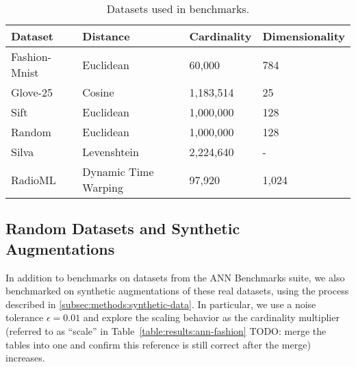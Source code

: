 \begin{table}[!t]
    \caption{Datasets used in benchmarks.}
    \label{table:datasets:summary}
    \vskip 0.15in
    \begin{center}
        \begin{small}
            \begin{sc}
                \begin{tabular}{|l|l|l|l|}
                    \hline
                    \textbf{Dataset} & \textbf{Distance}  &\textbf{Cardinality}  & \textbf{Dimensionality}  \\
                    \hline
                    Fashion-Mnist    & Euclidean              & 60,000             & 784       \\
                    \hline
                    Glove-25         & Cosine                 & 1,183,514          & 25        \\
                    \hline
                    Sift             & Euclidean              & 1,000,000          & 128       \\
                    \hline
                    Random           & Euclidean              & 1,000,000          & 128       \\
                    \hline
                    Silva            & Levenshtein            & 2,224,640          & -         \\
                    \hline
                    RadioML          & Dynamic Time Warping   & 97,920             & 1,024     \\
                    \hline
                \end{tabular}
            \end{sc}
        \end{small}
    \end{center}
    \vskip -0.1in
\end{table}

\subsection{Random Datasets and Synthetic Augmentations}
\label{subsec:random-datasets}

In addition to benchmarks on datasets from the ANN Benchmarks suite, we also benchmarked on synthetic augmentations of these real datasets, using the process described in \ref{subsec:methods:synthetic-data}. 
In particular, we use a noise tolerance $\epsilon = 0.01$ and explore the scaling behavior as the cardinality multiplier (referred to as ``scale'' in Table~\ref{table:results:ann-fashion} {\color{red} TODO: merge the tables into one and confirm this reference is still correct after the merge}) increases. 


